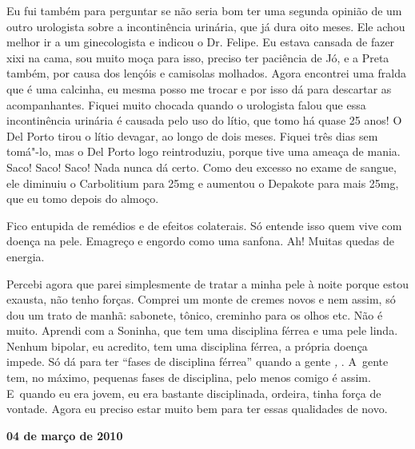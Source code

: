 Eu fui também para perguntar se não seria bom ter uma segunda opinião de
um outro urologista sobre a incontinência urinária, que já dura oito
meses. Ele achou melhor ir a um ginecologista e indicou o Dr. Felipe. Eu
estava cansada de fazer xixi na cama, sou muito moça para isso, preciso
ter paciência de Jó, e a Preta também, por causa dos lençóis e camisolas
molhados. Agora encontrei uma fralda que é uma calcinha, eu mesma posso
me trocar e por isso dá para descartar as acompanhantes. Fiquei muito
chocada quando o urologista falou que essa incontinência urinária é
causada pelo uso do lítio, que tomo há quase 25 anos! O Del Porto tirou
o lítio devagar, ao longo de dois meses. Fiquei três dias sem tomá"-lo,
mas o Del Porto logo reintroduziu, porque tive uma ameaça de mania.
Saco! Saco! Saco! Nada nunca dá certo. Como deu excesso no exame de
sangue, ele diminuiu o Carbolitium para 25mg e aumentou o Depakote para
mais 25mg, que eu tomo depois do almoço.

Fico entupida de remédios e de efeitos colaterais. Só entende isso quem
vive com doença na pele. Emagreço e engordo como uma sanfona. Ah! Muitas
quedas de energia.

Percebi agora que parei simplesmente de tratar a minha pele à noite
porque estou exausta, não tenho forças. Comprei um monte de cremes novos
e nem assim, só dou um trato de manhã: sabonete, tônico, creminho para
os olhos etc. Não é muito. Aprendi com a Soninha, que tem uma disciplina
férrea e uma pele linda. Nenhum bipolar, eu acredito, tem uma disciplina
férrea, a própria doença impede. Só dá para ter ``fases de disciplina
férrea'' quando a gente  \emph{,}  . A~gente tem, no
máximo, pequenas fases de disciplina, pelo menos comigo é assim. E~quando eu era jovem, eu era bastante disciplinada, ordeira, tinha força
de vontade. Agora eu preciso estar muito bem para ter essas
qualidades de novo.

\begin{center}\textbf{\asterisc{}}\end{center}


\begin{flushright}\textbf{04 de março de 2010}\end{flushright}


